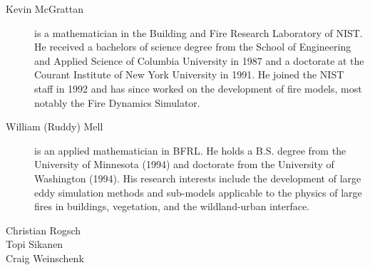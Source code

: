 \begin{description}
\item[Kevin McGrattan] is a mathematician in the Building and Fire Research Laboratory of NIST. He received a bachelors of science degree from the School of Engineering and Applied Science of Columbia University in 1987 and a doctorate at the Courant Institute of New York University in 1991. He joined the NIST staff in 1992 and has since worked on the development of fire models, most notably the Fire Dynamics Simulator.

\item[William (Ruddy) Mell] is an applied mathematician in BFRL. He holds a B.S. degree from the University of Minnesota (1994) and doctorate from the University of Washington (1994). His research interests include the development of large eddy simulation methods and sub-models applicable to the physics of large fires in buildings, vegetation, and the wildland-urban interface.

\item[Christian Rogsch]

\item[Topi Sikanen]

\item[Craig Weinschenk]

\end{description}


